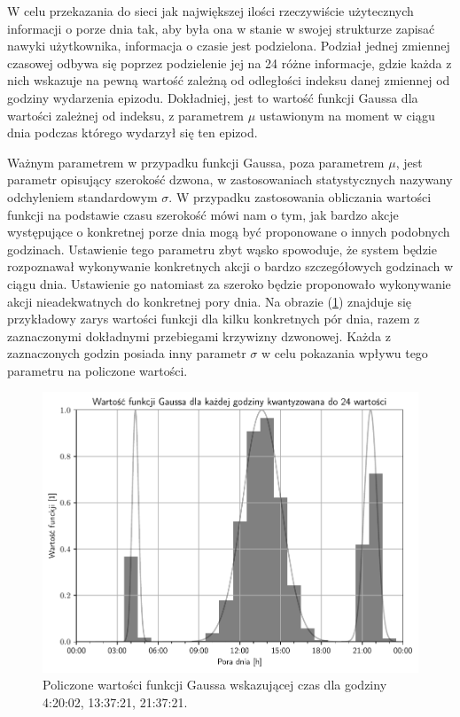 W celu przekazania do sieci jak największej ilości rzeczywiście użytecznych informacji o porze dnia tak, aby była ona w stanie w swojej strukturze zapisać nawyki użytkownika, informacja o czasie jest podzielona. Podział jednej zmiennej czasowej odbywa się poprzez podzielenie jej na 24 różne informacje, gdzie każda z nich wskazuje na pewną wartość zależną od odległości indeksu danej zmiennej od godziny wydarzenia epizodu. Dokładniej, jest to wartość funkcji Gaussa dla wartości zależnej od indeksu, z parametrem $\mu$ ustawionym na moment w ciągu dnia podczas którego wydarzył się ten epizod.

Ważnym parametrem w przypadku funkcji Gaussa, poza parametrem $\mu$, jest parametr opisujący szerokość dzwona, w zastosowaniach statystycznych nazywany odchyleniem standardowym $\sigma$. W przypadku zastosowania obliczania wartości funkcji na podstawie czasu szerokość mówi nam o tym, jak bardzo akcje występujące o konkretnej porze dnia mogą być proponowane o innych podobnych godzinach. Ustawienie tego parametru zbyt wąsko spowoduje, że system będzie rozpoznawał wykonywanie konkretnych akcji o bardzo szczegółowych godzinach w ciągu dnia. Ustawienie go natomiast za szeroko będzie proponowało wykonywanie akcji nieadekwatnych do konkretnej pory dnia. Na obrazie (\ref{fig:time_param}) znajduje się przykładowy zarys wartości funkcji dla kilku konkretnych pór dnia, razem z zaznaczonymi dokładnymi przebiegami krzywizny dzwonowej. Każda z zaznaczonych godzin posiada inny parametr $\sigma$ w celu pokazania wpływu tego parametru na policzone wartości.

\begin{figure}
    \centering\includegraphics[width=1.00\textwidth]{img/time_param.pdf}
    \caption{Policzone wartości funkcji Gaussa wskazującej czas dla godziny 4:20:02, 13:37:21, 21:37:21.} \label{fig:time_param}
\end{figure}


